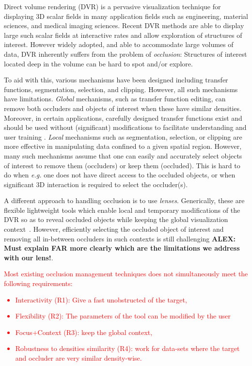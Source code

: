 Direct volume rendering (DVR) is a pervasive visualization technique for displaying 3D scalar fields in many application fields such as engineering, material sciences, and medical imaging sciences. Recent DVR methods are able to display large such scalar fields at interactive rates and allow exploration of structures of interest. However widely adopted, and able to accommodate large volumes of data, DVR inherently suffers from the problem of \emph{occlusion}: Structures of interest located deep in the volume can be hard to spot and/or explore.

To aid with this, various mechanisms have been designed including transfer functions, segmentation, selection, and clipping. However, all such mechanisms have limitations.  \emph{Global} mechanisms, such as transfer function editing, can remove both occluders and objects of interest when these have similar densities. Moreover, in certain applications, carefully designed transfer functions exist and should be used without (significant) modifications to facilitate understanding and user training \cite{4276082}. \emph{Local} mechanisms such as segmentation, selection, or clipping are more effective in manipulating data confined to a given spatial region. However, many such mechanisms assume that one can easily and accurately select objects of interest to remove them (occluders) or keep them (occluded). This is hard to do when \emph{e.g.} one does not have direct access to the occluded objects, or when significant 3D interaction is required to select the occluder(s).

A different approach to handling occlusion is to use \emph{lenses}. Generically, these are flexible lightweight tools which enable local and temporary modifications of the DVR so as to reveal occluded objects while keeping the global visualization context~\cite{595268,CGF:CGF12871,6327262}. However, efficiently selecting the occluded object of interest and removing all in-between occluders in such contexts is still challenging \textbf{ALEX: Must explain FAR more clearly which are the limitations we address with our lens!}. \textcolor{red}{
Most existing occlusion management techniques does not simultaneously meet the following requirements:  
\begin{itemize}
\item Interactivity (R1): Give a fast unobstructed of the target,
\item Flexibility (R2): The parameters of the tool can be modified by the user
\item Focus+Context (R3): keep the global context,
\item Robustness to densities similarity (R4): work for data-sets where the target and occluder are very similar density-wise.
\end{itemize}
}

